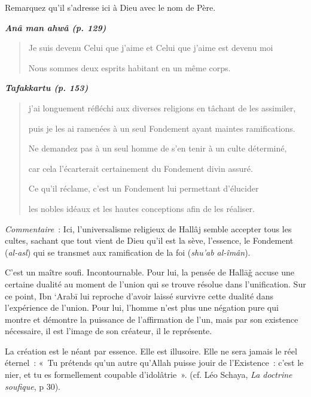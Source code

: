 Remarquez qu'il s'adresse ici à Dieu avec le nom de Père.

\emph{\textbf{Anâ man ahwâ (p. 129)}}

\begin{quote}
Je suis devenu Celui que j'aime et Celui que j'aime est devenu moi

Nous sommes deux esprits habitant en un même corps.
\end{quote}

\emph{\textbf{Tafakkartu (p. 153)}}

\begin{quote}
j'ai longuement réfléchi aux diverses religions en tâchant de les
assimiler,

puis je les ai ramenées à un seul Fondement ayant maintes ramifications.

Ne demandez pas à un seul homme de s'en tenir à un culte déterminé,

car cela l'écarterait certainement du Fondement divin assuré.

Ce qu'il réclame, c'est un Fondement lui permettant d'élucider

les nobles idéaux et les hautes conceptions afin de les réaliser.
\end{quote}

\emph{Commentaire~}: Ici, l'universalisme religieux de Hallâj semble
accepter tous les cultes, sachant que tout vient de Dieu qu'il est la
sève, l'essence, le Fondement (\emph{al-asl}) qui se transmet aux
ramification de la foi (\emph{shu'ab al-îmân}).


C'est un maître soufi. Incontournable. Pour lui, la pensée de Hallāǧ
accuse une certaine dualité au moment de l'union qui se trouve résolue
dans l'unification. Sur ce point, Ibn `Arabī lui reproche d'avoir laissé
survivre cette dualité dans l'expérience de l'union. Pour lui, l'homme
n'est plus une négation pure qui montre et démontre la puissance de
l'affirmation de l'un, mais par son existence nécessaire, il est l'image
de son créateur, il le représente.

La création est le néant par essence. Elle est illusoire. Elle ne sera
jamais le réel éternel~: «~Tu prétends qu'un autre qu'Allah puisse jouir
de l'Existence~: c'est le nier, et tu es formellement coupable
d'idolâtrie~». (cf. Léo Schaya, \emph{La doctrine soufique}, p 30).

